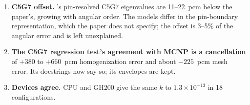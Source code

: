 \begin{enumerate}
\item \textbf{C5G7 offset.} \garnet's pin-resolved C5G7 eigenvalues are
  11--22~pcm below the paper's, growing with angular order. The models
  differ in the pin-boundary representation, which the paper does not
  specify; the offset is 3--5\% of the angular error and is left
  unexplained.

\item \textbf{The C5G7 regression test's agreement with MCNP is a
  cancellation} of $+380$ to $+660$~pcm homogenization error and about
  $-225$~pcm mesh error. Its docstrings now say so; its envelopes are kept.

\item \textbf{Devices agree.} CPU and GH200 give the same $k$ to
  $1.3 \times 10^{-13}$ in 18 configurations.
\end{enumerate}
